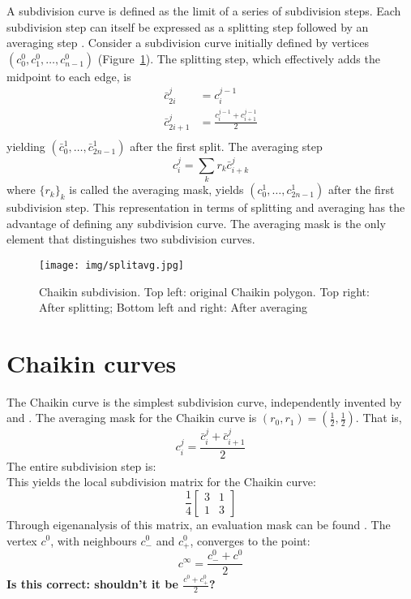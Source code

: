 \documentclass[12pt]{article}
\begin{document}
A subdivision curve is defined as the limit of a series of subdivision steps.
Each subdivision step can itself be expressed as a splitting step followed
by an averaging step \cite{stollnitz96}.
Consider a subdivision curve initially defined by vertices 
$(c_0^0, c_1^0, \ldots, c_{n-1}^0)$
(Figure~\ref{fig:splitavg}).
The splitting step, which effectively adds the midpoint to each edge, is 
\[
\begin{array}{ll}
	\bar{c}_{2i}^j   & = c_i^{j-1} \\
	\bar{c}_{2i+1}^j & = \frac{c_i^{j-1} + c_{i+1}^{j-1}}{2} \\
\end{array}
\]
yielding $(\bar{c}_0^1, \ldots, \bar{c}_{2n-1}^1)$ after the first split.
The averaging step
\[
	c_i^j 	= \sum_k r_k \bar{c}_{i+k}^j
\]
where $\{r_k\}_k$ is called the averaging mask,
yields $(c_0^1,\ldots,c_{2n-1}^1)$ after the first subdivision step.
This representation in terms of splitting and averaging has the advantage of defining any subdivision curve.
The averaging mask is the only element that distinguishes two subdivision curves.

\begin{figure}[h]
\begin{center}
\texttt{[image: img/splitavg.jpg]}
\end{center}
\caption{Chaikin subdivision. Top left: original Chaikin polygon.
	Top right: After splitting; Bottom left and right: After averaging}
\label{fig:splitavg}
\end{figure}


\section{Chaikin curves}

The Chaikin curve is the simplest subdivision curve,
independently invented by \cite{chaikin74} and \cite{deRham47,deRham56}.
The averaging mask for the Chaikin curve is $(r_0,r_1) = (\frac{1}{2},\frac{1}{2})$.
That is,
\[
	c_i^j 	= \frac{\bar{c}_i^j + \bar{c}_{i+1}^j}{2}
\]
The entire subdivision step is:
\[
\]
This yields the local subdivision matrix for the Chaikin curve:
\[
\frac{1}{4} \left[
\begin{array}{cc}
3 & 1 \\
1 & 3
\end{array}
\right]
\]
Through eigenanalysis of this matrix, an evaluation mask can be found \cite{stollnitz96}. %
The vertex $c^0$, with neighbours $c_{-}^0$ and $c_{+}^0$,
converges to the point:
\[
	c^{\infty} = \frac{c_{-}^0 + c^0}{2}
\]
{\bf Is this correct: shouldn't it be $\frac{c^0 + c_{+}^0}{2}$?}
\end{document}
